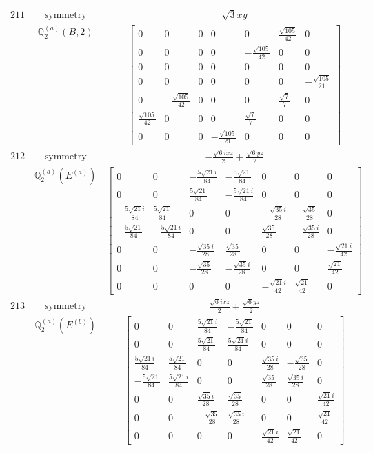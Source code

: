 \documentclass[fleqn,8pt,landscape]{jsarticle}
\begin{document}
\begin{longtable}{ccc}
$ 211 $ & $ \text{symmetry} $ & $ \sqrt{3} x y $ \\
$  $ & $ \mathbb{Q}_{2}^{(a)}(B,2) $ & $ \begin{bmatrix} 0 & 0 & 0 & 0 & 0 & \frac{\sqrt{105}}{42} & 0 \\ 0 & 0 & 0 & 0 & - \frac{\sqrt{105}}{42} & 0 & 0 \\ 0 & 0 & 0 & 0 & 0 & 0 & 0 \\ 0 & 0 & 0 & 0 & 0 & 0 & - \frac{\sqrt{105}}{21} \\ 0 & - \frac{\sqrt{105}}{42} & 0 & 0 & 0 & \frac{\sqrt{7}}{7} & 0 \\ \frac{\sqrt{105}}{42} & 0 & 0 & 0 & \frac{\sqrt{7}}{7} & 0 & 0 \\ 0 & 0 & 0 & - \frac{\sqrt{105}}{21} & 0 & 0 & 0 \end{bmatrix} $ \\ \hline
$ 212 $ & $ \text{symmetry} $ & $ - \frac{\sqrt{6} i x z}{2} + \frac{\sqrt{6} y z}{2} $ \\
$  $ & $ \mathbb{Q}_{2}^{(a)}(E^{(a)}) $ & $ \begin{bmatrix} 0 & 0 & - \frac{5 \sqrt{21} i}{84} & - \frac{5 \sqrt{21}}{84} & 0 & 0 & 0 \\ 0 & 0 & \frac{5 \sqrt{21}}{84} & - \frac{5 \sqrt{21} i}{84} & 0 & 0 & 0 \\ - \frac{5 \sqrt{21} i}{84} & \frac{5 \sqrt{21}}{84} & 0 & 0 & - \frac{\sqrt{35} i}{28} & - \frac{\sqrt{35}}{28} & 0 \\ - \frac{5 \sqrt{21}}{84} & - \frac{5 \sqrt{21} i}{84} & 0 & 0 & \frac{\sqrt{35}}{28} & - \frac{\sqrt{35} i}{28} & 0 \\ 0 & 0 & - \frac{\sqrt{35} i}{28} & \frac{\sqrt{35}}{28} & 0 & 0 & - \frac{\sqrt{21} i}{42} \\ 0 & 0 & - \frac{\sqrt{35}}{28} & - \frac{\sqrt{35} i}{28} & 0 & 0 & \frac{\sqrt{21}}{42} \\ 0 & 0 & 0 & 0 & - \frac{\sqrt{21} i}{42} & \frac{\sqrt{21}}{42} & 0 \end{bmatrix} $ \\ \hline
$ 213 $ & $ \text{symmetry} $ & $ \frac{\sqrt{6} i x z}{2} + \frac{\sqrt{6} y z}{2} $ \\
$  $ & $ \mathbb{Q}_{2}^{(a)}(E^{(b)}) $ & $ \begin{bmatrix} 0 & 0 & \frac{5 \sqrt{21} i}{84} & - \frac{5 \sqrt{21}}{84} & 0 & 0 & 0 \\ 0 & 0 & \frac{5 \sqrt{21}}{84} & \frac{5 \sqrt{21} i}{84} & 0 & 0 & 0 \\ \frac{5 \sqrt{21} i}{84} & \frac{5 \sqrt{21}}{84} & 0 & 0 & \frac{\sqrt{35} i}{28} & - \frac{\sqrt{35}}{28} & 0 \\ - \frac{5 \sqrt{21}}{84} & \frac{5 \sqrt{21} i}{84} & 0 & 0 & \frac{\sqrt{35}}{28} & \frac{\sqrt{35} i}{28} & 0 \\ 0 & 0 & \frac{\sqrt{35} i}{28} & \frac{\sqrt{35}}{28} & 0 & 0 & \frac{\sqrt{21} i}{42} \\ 0 & 0 & - \frac{\sqrt{35}}{28} & \frac{\sqrt{35} i}{28} & 0 & 0 & \frac{\sqrt{21}}{42} \\ 0 & 0 & 0 & 0 & \frac{\sqrt{21} i}{42} & \frac{\sqrt{21}}{42} & 0 \end{bmatrix} $ \\ \hline

\end{longtable}
\end{document}
